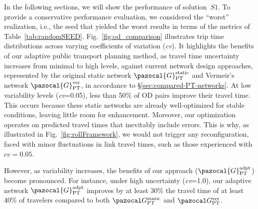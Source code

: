 \documentclass[a4paper,fleqn]{cas-sc}
\begin{document}
In the following sections, we will show the performance of solution~$S1$. To provide a conservative performance evaluation, we considered the ``worst'' realization, i.e., the seed that yielded the worst results in terms of the metrics of Table~\ref{tab:randomSEED}.
Fig.~\ref{fig:od_comparison} illustrates trip time distributions across varying coefficients of variation (\textit{cv}). It highlights the benefits of our adaptive public transport planning method, as travel time uncertainty increases from minimal to high levels, against current network design approaches, represented by the original static network $\pazocal{G}_{\text{PT}}^{\text{static}}$ and Vermeir's network $\pazocal{G}_{\text{PT}}^{\text{ver}}$, in accordance to \S{}\ref{sec:compared-PT-networks}.
%
At low variability levels (\textit{cv}=0.05), less than 50\% of OD pairs improve their travel time. This occurs because these static networks are already well-optimized for stable conditions, leaving little room for enhancement. 
%
Moreover, our optimization operates on predicted travel times that inevitably include errors. This is why, as illustrated in Fig.~\ref{fig:rollFramework}, we would not trigger any reconfiguration, faced with minor fluctuations in link travel times, such as those experienced with $\textit{cv}=0.05$.

However, as variability increases, the benefits of our approach ($\pazocal{G}_{\text{PT}}^{\text{adpt}}$) become pronounced. For instance, under high uncertainty (\textit{cv}=1.0), our adaptive network $\pazocal{G}_{\text{PT}}^{\text{adpt}}$ improves by at least 30\% the travel time of at least 40\% of travelers compared to both $\pazocal G_\text{PT}^\text{static}$ and $\pazocal G_\text{PT}^\text{ver}$. 
\end{document}
